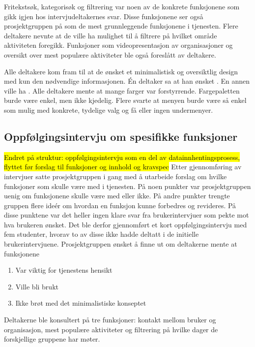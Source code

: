 Fritekstsøk, kategorisøk og filtrering var noen av de konkrete funksjonene som gikk igjen hos intervjudeltakernes svar. Disse funksjonene ser også prosjektgruppen på som de mest grunnleggende funksjonene i tjenesten. Flere deltakere nevnte at de ville ha mulighet til å filtrere på hvilket område aktiviteten foregikk. Funksjoner som videopresentasjon av organisasjoner og oversikt over mest populære aktiviteter ble også foreslått av deltakere.

Alle deltakere kom fram til at de ønsket et minimalistisk og oversiktlig design med kun den nødvendige informasjonen. Én deltaker sa at han ønsket . En annen ville ha . Alle deltakere mente at mange farger var forstyrrende. Fargepaletten burde være enkel, men ikke kjedelig. Flere svarte at menyen burde være så enkel som mulig med konkrete, tydelige valg og få eller ingen undermenyer.

\subsection{Oppfølgingsintervju om spesifikke funksjoner}
\hl{Endret på struktur: oppfølgingsintervju som en del av datainnhentingsprosess, flyttet før forslag til funksjoner og innhold og kravspec}
Etter gjennomføring av intervjuer satte prosjektgruppen i gang med å utarbeide forslag om hvilke funksjoner som skulle være med i tjenesten. På noen punkter var prosjektgruppen uenig om funksjonene skulle være med eller ikke. På andre punkter trengte gruppen flere ideér om hvordan en funksjon kunne forbedres og revideres. På disse punktene var det heller ingen klare svar fra brukerintervjuer som pekte mot hva brukeren ønsket. Det ble derfor gjennomført et kort oppfølgingsintervju med fem studenter, hvorav to av disse ikke hadde deltatt i de initielle brukerintervjuene. Prosjektgruppen ønsket å finne ut om deltakerne mente at funksjonene

\begin{enumerate}
\item Var viktig for tjenestens hensikt
\item Ville bli brukt
\item Ikke brøt med det minimalistiske konseptet
\end{enumerate}

Deltakerne ble konsultert på tre funksjoner: kontakt mellom bruker og organisasjon, mest populære aktiviteter og filtrering på hvilke dager de forskjellige gruppene har møter.

